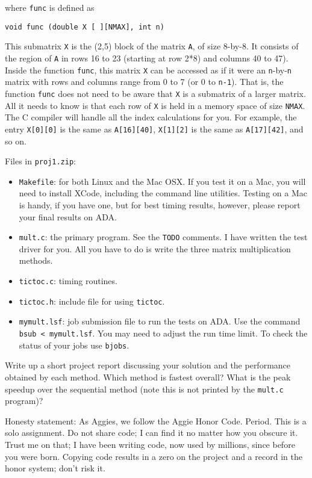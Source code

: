 \documentclass[11pt]{article}
\begin{document}
where \verb'func' is defined as

\begin{verbatim}
void func (double X [ ][NMAX], int n)
\end{verbatim}

This submatrix \verb'X' is the (2,5) block of the matrix \verb'A', of size
8-by-8.  It consists of the region of \verb'A' in rows 16 to 23 (starting
at row 2*8) and columns 40 to 47).  Inside the function \verb'func', this
matrix \verb'X' can be accessed as if it were an \verb'n'-by-\verb'n'
matrix with rows and columns range from 0 to 7 (or 0 to \verb'n-1').
That is, the function \verb'func' does not need to be aware that \verb'X' is
a submatrix of a larger matrix.  All it needs to know is that each row
of \verb'X' is held in a memory space of size \verb'NMAX'.  The C compiler
will handle all the index calculations for you.  For example, the entry
\verb'X[0][0]' is the same as \verb'A[16][40]',
\verb'X[1][2]' is the same as \verb'A[17][42]', and so on.

Files in \verb'proj1.zip':

\begin{itemize}
\item \verb'Makefile':  for both Linux and the Mac OSX.  If you test it on
a Mac, you will need to install XCode, including the command line utilities.
Testing on a Mac is handy, if you have one, but for
best timing results, however, please report your final results on ADA.

\item \verb'mult.c': the primary program.  See the \verb'TODO' comments.
I have written the test driver for you.  All you have to do is write the
three matrix multiplication methods.

\item \verb'tictoc.c': timing routines.

\item \verb'tictoc.h': include file for using \verb'tictoc'.

\item \verb'mymult.lsf':  job submission file to run the tests on ADA.
Use the command {\tt bsub < mymult.lsf}.  You may need to adjust the
run time limit.  To check the status of your jobs use \verb'bjobs'.

\end{itemize}

Write up a short project report discussing your solution and the performance
obtained by each method.  Which method is fastest overall?  What is the peak
speedup over the sequential method (note this is not printed by the 
\verb'mult.c' program)?

Honesty statement:  As Aggies, we follow the Aggie Honor Code.  Period.  This
is a solo assignment.  Do not share code; I can find it no matter how you
obscure it.  Trust me on that; I have been writing code, now used by millions,
since before you were born.  Copying code results in a zero on the project and
a record in the honor system; don't risk it.
\end{document}
